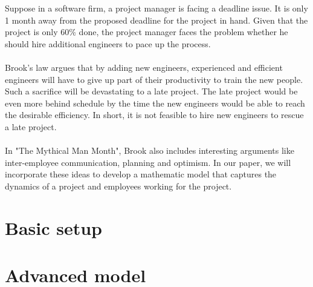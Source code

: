 \documentclass{article}
\begin{document}
Suppose in a software firm, a project manager is facing a deadline issue. It is only 1 month away from the proposed deadline for the project in hand. Given that the project is only 60\% done, the project manager faces the problem whether he should hire additional engineers to pace up the process.\\\\
Brook’s law argues that by adding new engineers, experienced and efficient engineers will have to give up part of their productivity to train the new people. Such a sacrifice will be devastating to a late project. The late project would be even more behind schedule by the time the new engineers would be able to reach the desirable efficiency. In short, it is not feasible to hire new engineers to rescue a late project.\\\\
In "The Mythical Man Month", Brook also includes interesting arguments like inter-employee communication, planning and optimism. In our paper, we will incorporate these ideas to develop a mathematic model that captures the dynamics of a project and employees working for the project.

\section*{Basic setup}

\section*{Advanced model}
\end{document}
